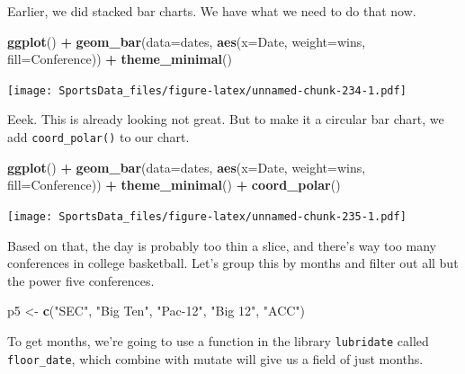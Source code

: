 \documentclass[
]{book}
\newenvironment{Shaded}{\begin{snugshade}}{\end{snugshade}}
\newcommand{\DataTypeTok}[1]{\textcolor[rgb]{0.13,0.29,0.53}{#1}}
\newcommand{\KeywordTok}[1]{\textcolor[rgb]{0.13,0.29,0.53}{\textbf{#1}}}
\newcommand{\NormalTok}[1]{#1}
\newcommand{\OperatorTok}[1]{\textcolor[rgb]{0.81,0.36,0.00}{\textbf{#1}}}
\newcommand{\StringTok}[1]{\textcolor[rgb]{0.31,0.60,0.02}{#1}}
\begin{document}
Earlier, we did stacked bar charts. We have what we need to do that now.

\begin{Shaded}
\begin{Highlighting}[]
\KeywordTok{ggplot}\NormalTok{() }\OperatorTok{+}\StringTok{ }\KeywordTok{geom_bar}\NormalTok{(}\DataTypeTok{data=}\NormalTok{dates, }\KeywordTok{aes}\NormalTok{(}\DataTypeTok{x=}\NormalTok{Date, }\DataTypeTok{weight=}\NormalTok{wins, }\DataTypeTok{fill=}\NormalTok{Conference)) }\OperatorTok{+}\StringTok{ }\KeywordTok{theme_minimal}\NormalTok{()}
\end{Highlighting}
\end{Shaded}

\texttt{[image: SportsData\_files/figure-latex/unnamed-chunk-234-1.pdf]}

Eeek. This is already looking not great. But to make it a circular bar chart, we add \texttt{coord\_polar()} to our chart.

\begin{Shaded}
\begin{Highlighting}[]
\KeywordTok{ggplot}\NormalTok{() }\OperatorTok{+}\StringTok{ }\KeywordTok{geom_bar}\NormalTok{(}\DataTypeTok{data=}\NormalTok{dates, }\KeywordTok{aes}\NormalTok{(}\DataTypeTok{x=}\NormalTok{Date, }\DataTypeTok{weight=}\NormalTok{wins, }\DataTypeTok{fill=}\NormalTok{Conference)) }\OperatorTok{+}\StringTok{ }\KeywordTok{theme_minimal}\NormalTok{() }\OperatorTok{+}\StringTok{ }\KeywordTok{coord_polar}\NormalTok{()}
\end{Highlighting}
\end{Shaded}

\texttt{[image: SportsData\_files/figure-latex/unnamed-chunk-235-1.pdf]}

Based on that, the day is probably too thin a slice, and there's way too many conferences in college basketball. Let's group this by months and filter out all but the power five conferences.

\begin{Shaded}
\begin{Highlighting}[]
\NormalTok{p5 <-}\StringTok{ }\KeywordTok{c}\NormalTok{(}\StringTok{"SEC"}\NormalTok{, }\StringTok{"Big Ten"}\NormalTok{, }\StringTok{"Pac-12"}\NormalTok{, }\StringTok{"Big 12"}\NormalTok{, }\StringTok{"ACC"}\NormalTok{)}
\end{Highlighting}
\end{Shaded}

To get months, we're going to use a function in the library \texttt{lubridate} called \texttt{floor\_date}, which combine with mutate will give us a field of just months.
\end{document}
